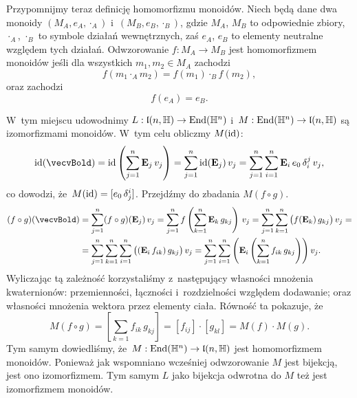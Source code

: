 \documentclass[a4paper,11pt]{article}
\numberwithin{equation}{section}
\begin{document}
Przypomnijmy teraz definicję homomorfizmu monoidów. Niech będą dane dwa
monoidy $( M_{ A }, e_{ A }, \cdot_{ A } )$ i~$( M_{ B }, e_{ B }, \cdot_{ B } )$, gdzie
$M_{ A }$, $M_{ B }$ to odpowiednie zbiory, $\cdot_{ A }$, $\cdot_{ B }$ to symbole
działań wewnętrznych, zaś $e_{ A }$, $e_{ B }$ to elementy neutralne względem
tych działań. Odwzorowanie $f : M_{ A } \to M_{ B }$ jest homomorfizmem
monoidów jeśli dla wszystkich $m_{ 1 }, m_{ 2 } \in M_{ A }$ zachodzi
\begin{equation}
  \label{eq:Wojtynski-82}
  f( m_{ 1 } \cdot_{ A } m_{ 2 } ) = f( m_{ 1 } ) \cdot_{ B } f( m_{ 2 } ),
\end{equation}
oraz zachodzi
\begin{equation}
  \label{eq:Wojtynski-83}
  f( e_{ A } ) = e_{ B }.
\end{equation}

W~tym miejscu udowodnimy $L : \mathfrak{l}( n, \mathbb{H} ) \to \mathrm{End}( \mathbb{H}^{ n } )$
i~$M : \mathrm{End}( \mathbb{H}^{ n } ) \to \mathfrak{l}( n, \mathbb{H} )$ są izomorfizmami monoidów.
W~tym celu obliczmy $M( \mathrm{id} )$:
\begin{equation}
  \label{eq:Wojtynski-84}
  \id( \vecvBold ) =
  \id\left( \sum_{ j = 1 }^{ n } \vecEbold_{ j } \, v_{ j } \right) =
  \sum_{ j = 1 }^{ n } \id( \vecEbold_{ j } ) \, v_{ j } =
  \sum_{ j = 1 }^{ n } \sum_{ i = 1 }^{ n } \vecEbold_{ i } \, e_{ 0 } \,
  \delta^{ j }_{ i } \, v_{ j },
\end{equation}
co dowodzi, że~$M( \mathrm{id} ) = [ e_{ 0 } \, \delta^{ i }_{ j } ]$. Przejdźmy do
zbadania $M( f \circ g )$.
\begin{equation}
  \label{eq:Wojtynski-85}
  \begin{split}
    ( f \circ g )( \vecvBold )
    &=
      \sum_{ j = 1 }^{ n } ( f \circ g )( \vecEbold_{ j } ) \, v_{ j } =
      \sum_{ j = 1 }^{ n } f\left(
      \sum_{ k = 1 }^{ n } \vecEbold_{ k } \, g_{ k j } \right) \, v_{ j } =
      \sum_{ j = 1 }^{ n } \sum_{ k = 1 }^{ n }
      \big( f( \vecEbold_{ k } ) \, g_{ k j } \big) \, v_{ j } = \\
    &=
      \sum_{ j = 1 }^{ n } \sum_{ k = 1 }^{ n } \sum_{ i = 1 }^{ n }
      \big( ( \vecEbold_{ i } \, f_{ i k } ) \, g_{ k j } \big) \, v_{ j } =
      \sum_{ j = 1 }^{ n } \sum_{ i = 1 }^{ n }
      \left( \vecEbold_{ i } \left( \sum_{ k = 1 }^{ n } f_{ i k } \, g_{ k j }
      \right) \right) v_{ j }.
  \end{split}
\end{equation}
Wyliczając tą zależność korzystaliśmy z~następujący własności mnożenia
kwaternionów: przemienności, łączności i~rozdzielności względem dodawanie;
oraz własności mnożenia wektora przez elementy ciała. Równość ta pokazuje,
że
\begin{equation}
  \label{eq:Wojtynski-86}
  M( f \circ g ) = \left[ \sum_{ k = 1 } f_{ i k } \, g_{ k j } \right] =
  [ f_{ i j } ] \cdot [ g_{ k l } ] = M( f ) \cdot M( g ).
\end{equation}
Tym samym dowiedliśmy, że~$M : \mathrm{End}( \mathbb{H}^{ n } ) \to \mathfrak{l}( n, \mathbb{H} )$ jest
homomorfizmem monoidów. Ponieważ jak wspomniano wcześniej odwzorowanie $M$
jest bijekcją, jest ono izomorfizmem. Tym samym $L$ jako bijekcja odwrotna
do $M$ też jest izomorfizmem monoidów.
\end{document}
